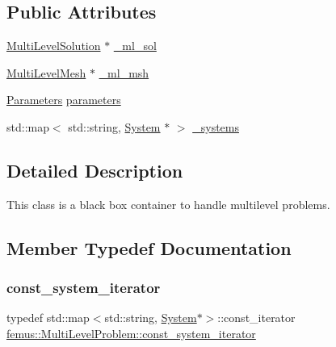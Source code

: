 \subsection*{Public Attributes}
\begin{DoxyCompactItemize}
\item 
\mbox{\hyperlink{classfemus_1_1_multi_level_solution}{Multi\+Level\+Solution}} $\ast$ \mbox{\hyperlink{classfemus_1_1_multi_level_problem_a6dd8fec26a0ffbaae07e6df7ea42d12b}{\+\_\+ml\+\_\+sol}}
\item 
\mbox{\hyperlink{classfemus_1_1_multi_level_mesh}{Multi\+Level\+Mesh}} $\ast$ \mbox{\hyperlink{classfemus_1_1_multi_level_problem_a946d39c3fba7fac859822702248fe065}{\+\_\+ml\+\_\+msh}}
\item 
\mbox{\hyperlink{classfemus_1_1_parameters}{Parameters}} \mbox{\hyperlink{classfemus_1_1_multi_level_problem_a537b31965e5402b9c9febebce96ce01c}{parameters}}
\item 
std\+::map$<$ std\+::string, \mbox{\hyperlink{classfemus_1_1_system}{System}} $\ast$ $>$ \mbox{\hyperlink{classfemus_1_1_multi_level_problem_af74d8678115d5a61bc0b4929fc74d50d}{\+\_\+systems}}
\end{DoxyCompactItemize}


\subsection{Detailed Description}
This class is a black box container to handle multilevel problems. 

\subsection{Member Typedef Documentation}
\mbox{\label{classfemus_1_1_multi_level_problem_a8bf081f150a9e5685fc9281fc1dccd16}} 
\subsubsection{\texorpdfstring{const\+\_\+system\+\_\+iterator}{const\_system\_iterator}}
{\footnotesize\ttfamily typedef std\+::map$<$std\+::string, \mbox{\hyperlink{classfemus_1_1_system}{System}}$\ast$$>$\+::const\+\_\+iterator \mbox{\hyperlink{classfemus_1_1_multi_level_problem_a8bf081f150a9e5685fc9281fc1dccd16}{femus\+::\+Multi\+Level\+Problem\+::const\+\_\+system\+\_\+iterator}}}

